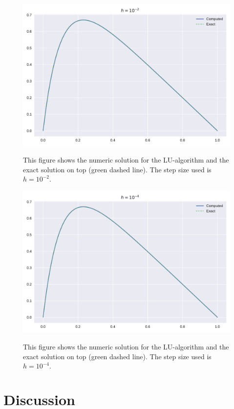 \documentclass[reprint, english,notitlepage]{revtex4-1}  %
\begin{document}
\begin{figure}[h]
	\centering
	\includegraphics[scale=0.5]{../output/lu_2.pdf}
	\label{fig:lu_2}
	\caption{This figure shows the numeric solution for the LU-algorithm and the exact solution on top (green dashed line). The step size used is $h=10^{-2}$.} 
\end{figure}

\begin{figure}[h]
	\centering
	\includegraphics[scale=0.5]{../output/lu_4.pdf}
	\label{fig:lu_4}
	\caption{This figure shows the numeric solution for the LU-algorithm and the exact solution on top (green dashed line). The step size used is $h=10^{-4}$.} 
\end{figure}
\section{Discussion}
\end{document}
